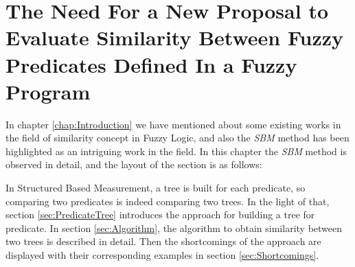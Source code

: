 \documentclass[egilmezThesis.tex]{subfiles}
\begin{document}
\chapter{The Need For a New  Proposal to Evaluate Similarity Between Fuzzy
Predicates Defined In a Fuzzy Program}
\label{chap:Justification}

In chapter \ref{chap:Introduction} we have mentioned about some existing works in the field of similarity concept in Fuzzy Logic, and also the \textit{SBM} method \cite{Lu} has been highlighted as an intriguing work in the field. In this chapter the \textit{SBM} method is observed in detail, and the layout of the section is as follows: 

In Structured Based Measurement,  a tree is built for each predicate, so comparing two predicates is indeed comparing two trees. In the light of that, section \ref{sec:PredicateTree} introduces the approach for building a tree for predicate. In section \ref{sec:Algorithm}, the algorithm to obtain similarity between two trees is described in detail. Then the shortcomings of the approach are displayed with their corresponding examples in section \ref{sec:Shortcomings}.


\end{document}
